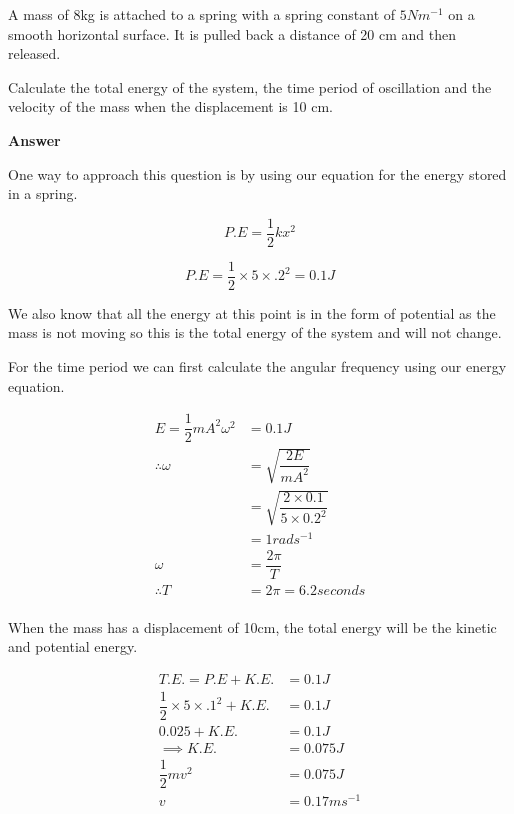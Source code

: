 \documentclass[main.tex]{subfiles}
\begin{document}
\begin{example}

A mass of 8kg is attached to a spring with a spring constant of $5 Nm^{-1}$ on a smooth horizontal surface.
It is pulled back a distance of 20 cm and then released. 

Calculate the total energy of the system, the time period of oscillation and the velocity of the mass when the displacement is 10 cm.




    
\textbf{Answer}

One way to approach this question is by using our equation for the energy stored in a spring.

\[
P.E = \dfrac{1}{2}kx^2
\]

\[
P.E = \dfrac{1}{2} \times 5 \times .2^2 = 0.1J
\]

We also know that all the energy at this point is in the form of potential as the mass is not moving so this is the total energy of the system and will not change.

For the time period we can first calculate the angular frequency using our energy equation.

\begin{align*} 
E = \dfrac{1}{2}mA^2\omega^2 &= 0.1 J\\
\therefore \omega &= \sqrt{\dfrac{2 E}{m A^2}}\\
&= \sqrt{\dfrac{2 \times 0.1}{5 \times 0.2^2}}\\
&= 1 rads^{-1}\\
\omega &= \dfrac{2 \pi}{T} \\
\therefore T &= 2 \pi = 6.2 seconds \\
\end{align*}


When the mass has a displacement of 10cm, the total energy will be the kinetic and potential energy.


\begin{align*} 
T.E. = P.E + K.E. &= 0.1J \\
 \dfrac{1}{2} \times 5 \times .1^2 + K.E. &= 0.1J\\
 0.025 + K.E. &= 0.1J  \\
 \implies K.E. &= 0.075J \\
 \dfrac{1}{2}mv^2 &= 0.075J \\
 v &= 0.17 ms^{-1} \\
 \end{align*}

\end{example}
\end{document}

